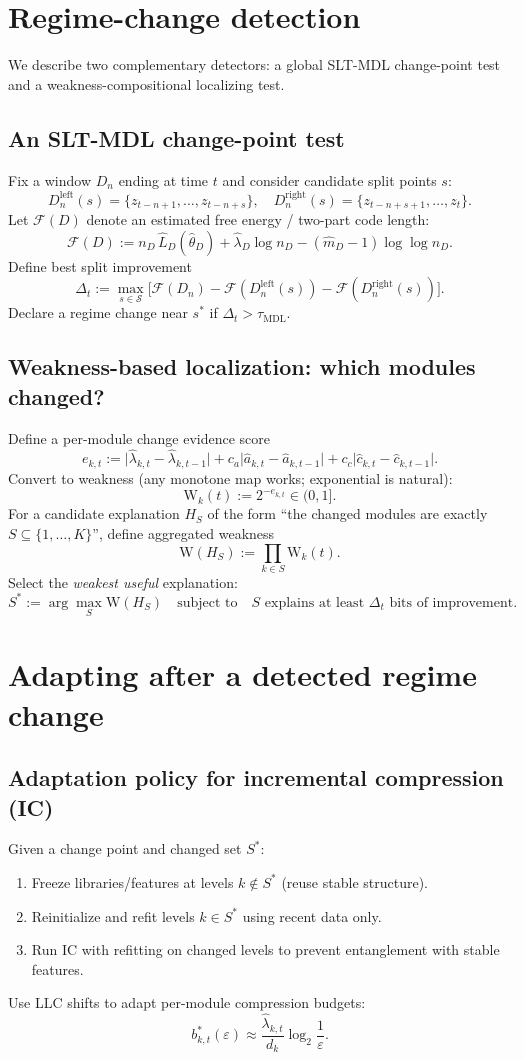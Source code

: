 \documentclass[11pt]{article}
\newcommand{\weak}{\mathrm{W}}  %
\newcommand{\Ffree}{\mathcal{F}}%
\begin{document}
\section{Regime-change detection}
We describe two complementary detectors: a global SLT-MDL change-point test and
a weakness-compositional localizing test.

\subsection{An SLT-MDL change-point test}
Fix a window $D_n$ ending at time $t$ and consider candidate split points $s$:
\[
D_n^{\mathrm{left}}(s)=\{z_{t-n+1},\dots,z_{t-n+s}\},\quad
D_n^{\mathrm{right}}(s)=\{z_{t-n+s+1},\dots,z_t\}.
\]
Let $\Ffree(D)$ denote an estimated free energy / two-part code length:
\[
\Ffree(D) := n_D\, \hat L_D(\hat\theta_D) + \hat\lambda_D \log n_D - (\hat m_D-1)\log\log n_D.
\]
Define best split improvement
\[
\Delta_t := \max_{s \in \mathcal{S}}
\Big[ \Ffree(D_n) - \Ffree(D_n^{\mathrm{left}}(s)) - \Ffree(D_n^{\mathrm{right}}(s)) \Big].
\]
Declare a regime change near $s^\ast$ if $\Delta_t>\tau_{\mathrm{MDL}}$.

\subsection{Weakness-based localization: which modules changed?}
Define a per-module change evidence score
\[
e_{k,t} := \big|\hat\lambda_{k,t}-\hat\lambda_{k,t-1}\big|
+ c_a \big|\hat a_{k,t}-\hat a_{k,t-1}\big|
+ c_c \big|\hat c_{k,t}-\hat c_{k,t-1}\big|.
\]
Convert to weakness (any monotone map works; exponential is natural):
\[
\weak_k(t) := 2^{-e_{k,t}} \in (0,1].
\]
For a candidate explanation $H_S$ of the form ``the changed modules are exactly $S\subseteq\{1,\dots,K\}$'',
define aggregated weakness
\[
\weak(H_S) := \prod_{k\in S} \weak_k(t).
\]
Select the \emph{weakest useful} explanation:
\[
S^\ast := \arg\max_S \weak(H_S)
\quad\text{subject to}\quad
\text{$S$ explains at least $\Delta_t$ bits of improvement.}
\]

\section{Adapting after a detected regime change}
\subsection{Adaptation policy for incremental compression (IC)}
Given a change point and changed set $S^\ast$:
\begin{enumerate}
  \item Freeze libraries/features at levels $k\notin S^\ast$ (reuse stable structure).
  \item Reinitialize and refit levels $k\in S^\ast$ using recent data only.
  \item Run IC with refitting on changed levels to prevent entanglement with stable features.
\end{enumerate}
Use LLC shifts to adapt per-module compression budgets:
\[
b^\ast_{k,t}(\varepsilon) \approx \frac{\hat\lambda_{k,t}}{d_k}\log_2\!\frac{1}{\varepsilon}.
\]
\end{document}
